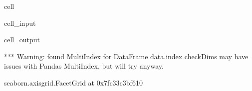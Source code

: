 \documentclass[letterpaper,table,10pt,english]{jupyterBook}
\begin{document}
\begin{sphinxuseclass}{cell}\begin{sphinxVerbatimInput}

\begin{sphinxuseclass}{cell_input}
\begin{sphinxVerbatim}[commandchars=\\\{\}]
  
     
                 
                     
\end{sphinxVerbatim}

\end{sphinxuseclass}\end{sphinxVerbatimInput}
\begin{sphinxVerbatimOutput}

\begin{sphinxuseclass}{cell_output}
\begin{sphinxVerbatim}[commandchars=\\\{\}]
*** Warning: found MultiIndex for DataFrame data.index \PYGZhy{} checkDims may have issues with Pandas MultiIndex, but will try anyway.
\end{sphinxVerbatim}

\begin{sphinxVerbatim}[commandchars=\\\{\}]
\PYGZlt{}seaborn.axisgrid.FacetGrid at 0x7fc33c3bf610\PYGZgt{}
\end{sphinxVerbatim}

\noindent{}

\end{sphinxuseclass}\end{sphinxVerbatimOutput}

\end{sphinxuseclass}
\end{document}
